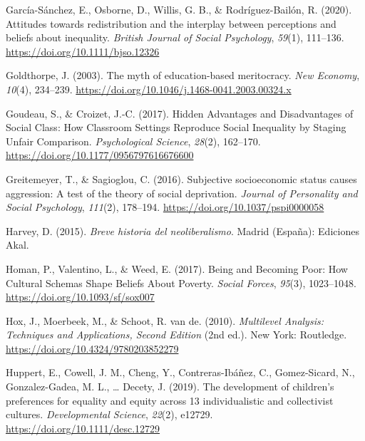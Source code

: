\documentclass[
  letterpaper,
  DIV=11,
  numbers=noendperiod]{scrartcl}
\newlength{\cslhangindent}
\newlength{\cslentryspacingunit} %
\newenvironment{CSLReferences}[2] %
 {%
  \setlength{\parindent}{0pt}
  \ifodd #1
  \let\oldpar\par
  \def\par{\hangindent=\cslhangindent\oldpar}
  \fi
  \setlength{\parskip}{#2\cslentryspacingunit}
 }%
 {}
\begin{document}
\begin{CSLReferences}{1}{0}
\leavevmode{}%
García-Sánchez, E., Osborne, D., Willis, G. B., \& Rodríguez-Bailón, R.
(2020). Attitudes towards redistribution and the interplay between
perceptions and beliefs about inequality. \emph{British Journal of
Social Psychology}, \emph{59}(1), 111--136.
\url{https://doi.org/10.1111/bjso.12326}

\leavevmode{}%
Goldthorpe, J. (2003). The myth of education-based meritocracy.
\emph{New Economy}, \emph{10}(4), 234--239.
\url{https://doi.org/10.1046/j.1468-0041.2003.00324.x}

\leavevmode{}%
Goudeau, S., \& Croizet, J.-C. (2017). Hidden {Advantages} and
{Disadvantages} of {Social Class}: {How Classroom Settings Reproduce
Social Inequality} by {Staging Unfair Comparison}. \emph{Psychological
Science}, \emph{28}(2), 162--170.
\url{https://doi.org/10.1177/0956797616676600}

\leavevmode{}%
Greitemeyer, T., \& Sagioglou, C. (2016). Subjective socioeconomic
status causes aggression: {A} test of the theory of social deprivation.
\emph{Journal of Personality and Social Psychology}, \emph{111}(2),
178--194. \url{https://doi.org/10.1037/pspi0000058}

\leavevmode{}%
Harvey, D. (2015). \emph{{Breve historia del neoliberalismo}}. Madrid
(Espa{ñ}a): Ediciones Akal.

\leavevmode{}%
Homan, P., Valentino, L., \& Weed, E. (2017). Being and {Becoming Poor}:
{How Cultural Schemas Shape Beliefs About Poverty}. \emph{Social
Forces}, \emph{95}(3), 1023--1048.
\url{https://doi.org/10.1093/sf/sox007}

\leavevmode{}%
Hox, J., Moerbeek, M., \& Schoot, R. van de. (2010). \emph{Multilevel
{Analysis}: {Techniques} and {Applications}, {Second Edition}} (2nd
ed.). New York: Routledge. \url{https://doi.org/10.4324/9780203852279}

\leavevmode{}%
Huppert, E., Cowell, J. M., Cheng, Y., Contreras-Ibáñez, C.,
Gomez-Sicard, N., Gonzalez-Gadea, M. L., \ldots{} Decety, J. (2019). The
development of children's preferences for equality and equity across 13
individualistic and collectivist cultures. \emph{Developmental Science},
\emph{22}(2), e12729. \url{https://doi.org/10.1111/desc.12729}


\end{CSLReferences}
\end{document}

